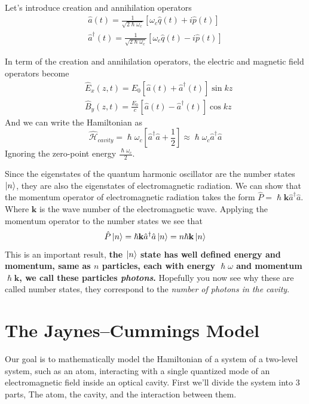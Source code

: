 Let’s introduce creation and annihilation operators
\begin{align*}
    \hat{a} (t) = \frac{1}{\sqrt{2\hslash\omega_c}}[\omega_c\hat{q} (t) + i\hat{p} (t)] \\
    \hat{a}^\dag (t) = \frac{1}{\sqrt{2\hslash\omega_c}}[\omega_c\hat{q} (t) - i\hat{p} (t)]
\end{align*}

In term of the creation and annihilation operators, the electric and magnetic field operators become
\begin{align}
         &\hat{E}_x (   z, t) = E_0[\hat{a} (t) + \hat{a}^\dag (t)]\sin{kz} \\
         &\hat{B}_y (z, t) = \frac{E_0}{c}[\hat{a} (t) - \hat{a}^\dag (t)]\cos{kz}
\end{align}
And we can write the Hamiltonian as
\begin{equation}\label{eq:cavity_hamiltonian}
    \hat{\mathcal{H}}_{cavity} = \hslash\omega_c[\hat{a}^\dag\hat{a} + \frac{1}{2}] \approx \hslash\omega_c\hat{a}^\dag\hat{a}
\end{equation}
Ignoring the zero-point energy $\frac{\hslash\omega_c}{2}$.

Since the eigenstates of the quantum harmonic oscillator are the number states $\ket{n}$, they are also the eigenstates of electromagnetic radiation. We can show that the momentum operator of electromagnetic radiation takes the form $\hat{P} = \hslash \mathbf{k} \hat{a}^\dag \hat{a}$. Where $\mathbf{k}$ is the wave number of the electromagnetic wave. Applying the momentum operator to the number states we  see that
\[
    \hat{P}\ket{n} =  \hslash \mathbf{k} \hat{a}^\dag \hat{a} \ket{n} = n\hslash \mathbf{k}\ket{n}
\]
This is an important result, \textbf{the $\ket{n}$ state has well defined energy and momentum, same as $n$ particles, each with energy $\hslash \omega$ and momentum $\hslash \mathbf{k}$, we call these particles \textit{photons}.} Hopefully you now see why these are called number states, they correspond to the \textit{number of photons in the cavity}.

\section{The Jaynes–Cummings Model}
Our goal is to mathematically model the Hamiltonian of a system of a two-level system, such as an atom, interacting with a single quantized mode of an electromagnetic field inside an optical cavity. First we'll divide the system into 3 parts, The atom, the cavity, and the interaction between them.

